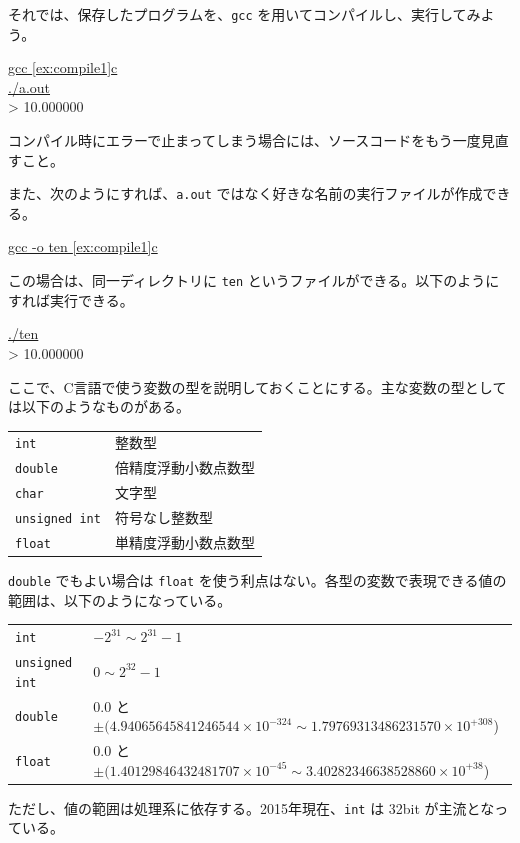 それでは、保存したプログラムを、\verb+gcc+ を用いてコンパイルし、実行してみよう。
\begin{commandline2}
\prompt \underline{gcc \ref{ex:compile1}c} \\
\prompt \underline{./a.out} \\
> 10.000000
\end{commandline2} \noindent
コンパイル時にエラーで止まってしまう場合には、ソースコードをもう一度見直すこと。

また、次のようにすれば、\verb+a.out+ ではなく好きな名前の実行ファイルが作成できる。
\begin{commandline2}
\prompt \underline{gcc -o ten \ref{ex:compile1}c}
\end{commandline2} \noindent
この場合は、同一ディレクトリに \verb+ten+ というファイルができる。以下のようにすれば実行できる。
\begin{commandline2}
\prompt \underline{./ten} \\
> 10.000000
\end{commandline2}

ここで、C言語で使う変数の型を説明しておくことにする。主な変数の型としては以下のようなものがある。
\begin{table}[H]
\begin{center}
\begin{tabular}{ll}
  \verb+int+           &整数型 \\
  \verb+double+        &倍精度浮動小数点数型 \\
  \verb+char+          &文字型 \\
  \verb+unsigned int+  &符号なし整数型 \\
  \verb+float+         &単精度浮動小数点数型
\end{tabular}
\end{center}
\end{table} \noindent
\verb+double+ でもよい場合は \verb+float+ を使う利点はない。各型の変数で表現できる値の範囲は、以下のようになっている。
\begin{table}[H]
\begin{center}
\begin{tabular}{ll}
  \verb+int+          & $-2^{31}\sim 2^{31}-1$ \\
  \verb+unsigned int+ & $0\sim 2^{32}-1$ \\
  \verb+double+       & {\small 0.0 と $\pm(4.94065645841246544\times10^{-324}\sim 1.79769313486231570\times10^{+308}$)} \\
  \verb+float+        & {\small 0.0 と $\pm(1.40129846432481707\times10^{-45}\sim 3.40282346638528860\times10^{+38}$)}
\end{tabular}
\end{center}
\end{table} \noindent
ただし、値の範囲は処理系に依存する。2015年現在、\verb+int+ は 32bit が主流となっている。

